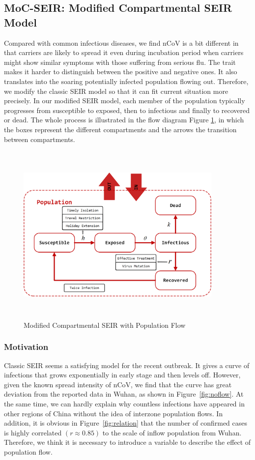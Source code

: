 \documentclass[12pt]{mcmthesis}
\begin{document}
\subsection{MoC-SEIR: Modified Compartmental SEIR Model}

Compared with common infectious diseases, we find nCoV is a bit different in that carriers are likely to spread it even during incubation period when carriers might show similar symptoms with those suffering from serious flu. The trait makes it harder to distinguish between the positive and negative ones. It also translates into the soaring potentially infected population flowing out. Therefore, we modify the classic SEIR model so that it can fit current situation more precisely. In our modified SEIR model, each member of the population typically progresses from susceptible to exposed, then to infectious and finally to recovered or dead. The whole process is illustrated in the flow diagram Figure \ref{fig:SEIR}, in which the boxes represent the different compartments and the arrows the transition between compartments.

\begin{figure}[H]
    \centering
    \includegraphics[width=0.9\textwidth,height=9cm]{053/figure/Flow_Chart.png}
    \caption{Modified Compartmental SEIR with Population Flow}
    \label{fig:SEIR}
\end{figure}

\subsubsection{Motivation}
Classic SEIR seems a satisfying model for the recent outbreak. It gives a curve of infections that grows exponentially in early stage and then levels off. However, given the known spread intensity of nCoV, we find that the curve has great deviation from the reported data in Wuhan, as shown in Figure~\ref{fig:noflow}. At the same time, we can hardly explain why countless infections have appeared in other regions of China without the idea of interzone population flows. In addition, it is obvious in Figure~\ref{fig:relation} that the number of confirmed cases is highly correlated $\left(r \approx 0.85\right)$ to the scale of inflow population from Wuhan. Therefore, we think it is necessary to introduce a variable to describe the effect of population flow.
\end{document}
